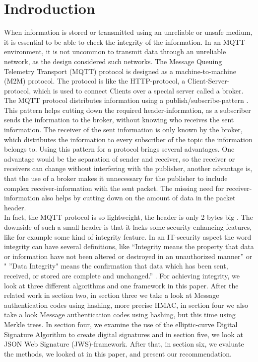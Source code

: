 \section{Indroduction}

When information is stored or transmitted using an unreliable or unsafe medium, it is essential to be able to check the integrity of the information. In an MQTT-environment, it is not uncommon to transmit data through an unreliable network, as the design considered such networks. The Message Queuing Telemetry Transport (MQTT) protocol is designed as a machine-to-machine (M2M) protocol. The protocol is like the HTTP-protocol, a Client-Server-protocol, which is used to connect Clients over a special server called a broker. The MQTT protocol distributes information using a publish/subscribe-pattern \cite{LIMI}. This pattern helps cutting down the required header-information, as a subscriber sends the information to the broker, without knowing who receives the sent information. The receiver of the sent information is only known by the broker, which distributes the information to every subscriber of the topic the information belongs to. Using this pattern for a protocol brings several advantages. One advantage would be the separation of sender and receiver, so the receiver or receivers can change without interfering with the publisher, another advantage is, that the use of a broker makes it unnecessary for the publisher to include complex receiver-information with the sent packet. The missing need for receiver-information also helps by cutting down on the amount of data in the packet header. \\
In fact, the MQTT protocol is so lightweight, the header is only 2 bytes big \cite{IBM}. The downside of such a small header is that it lacks some security enhancing features, like for example some kind of integrity feature. In an IT-security aspect the word integrity can have several definitions, like “Integrity means the property that data or information have not been altered or destroyed in an unauthorized manner”\cite{INTI1} or " ”Data Integrity" means the confirmation that data which has been sent, received, or stored are complete and unchanged.” \cite{INTI2}. For achieving integrity, we look at three different algorithms and one framework in this paper. After the related work in section two, in section three we take a look at Message authentication codes using hashing, more precise HMAC, in section four we also take a look Message authentication codes using hashing, but this time using Merkle trees. In section four, we examine the use of the elliptic-curve Digital Signature Algorithm to create digital signatures and in section five, we look at JSON Web Signature (JWS)-framework. After that, in section six, we evaluate the methods, we looked at in this paper, and present our recommendation.
